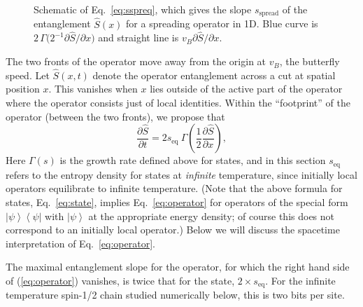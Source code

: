 \documentclass[aps,prx,twocolumn,superscriptaddress,floatfix,nofootinbib,prx]{revtex4}
\newcommand{\f}{\frac}
\renewcommand{\>}{\right\rangle}
\newcommand{\<}{\left\langle}
\newcommand{\lf}{\left(}
\newcommand{\ri}{\right)}
\newcommand{\bra}[1]{\< #1 \right|}
\newcommand{\ket}[1]{\left| #1 \>}
\newcommand{\sspr}{s_\text{spread}}
\newcommand{\seq}{s_\text{eq}}
\begin{document}
\begin{figure}[b]
\caption{
Schematic of Eq.~\ref{eq:sspreq}, which gives the slope $\sspr$ of the entanglement $\hat S(x)$ for  a spreading operator in 1D.
Blue curve is ${2\,\Gamma\big( 2^{-1} \partial \hat S/\partial x \big)}$ and straight line is ${v_B  \partial \hat S/\partial x}$.
} 
 \label{fig:ssprfig}
\end{figure}





 The two fronts of the operator  move away from the origin at $v_B$, the butterfly speed. Let  $\hat S(x,t)$ denote the operator entanglement across a cut at spatial position $x$.
This vanishes when $x$ lies outside of the active part of the operator where the operator consists just of local identities.  Within the ``footprint'' of the operator (between the two fronts), we propose that 
\begin{equation}
    \frac{\partial \hat S}{\partial t} = 2\seq~ \Gamma \lf\f{1}{2} \frac{\partial \hat S}{\partial x}\ri,
    \label{eq:operator}
\end{equation}
Here $\Gamma(s)$ is the growth rate defined above for states, and in this section $\seq$ refers to the entropy density for states at \textit{infinite} temperature, since initially local operators equilibrate to infinite temperature.
(Note that the above formula for states, Eq.~\ref{eq:state}, implies Eq.~\ref{eq:operator}  for  operators of the special form $\ket{\psi}\bra{\psi}$ with $\ket{\psi}$ at the appropriate energy density; of course this does not correspond to an initially local operator.)
Below we will discuss the spacetime interpretation of Eq.~\ref{eq:operator}.

The maximal entanglement slope for the operator, for which the right hand side of (\ref{eq:operator}) vanishes, is twice that for the state, $2\times \seq$. For the infinite temperature spin-1/2 chain studied numerically below, this is two bits per site.
\end{document}
